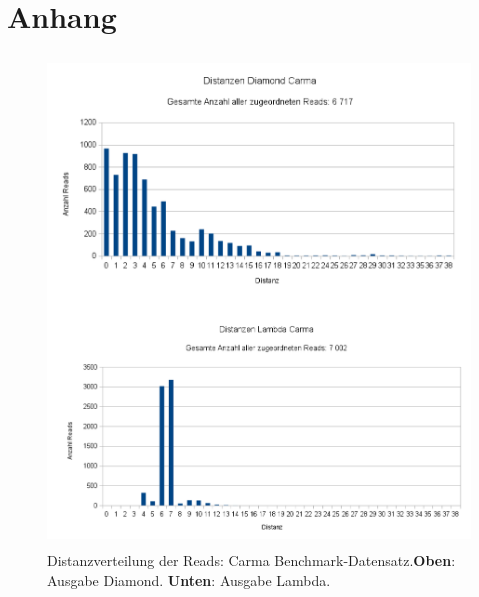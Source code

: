 \documentclass[10pt, a4paper]{report}[08.12.2015]
\begin{document}
\chapter{Anhang}
\begin{figure}[H]
      \centering
      \noindent\includegraphics[width=\linewidth,height=13cm,
      keepaspectratio]{Abbildungen/Carma_Distanzen_both.png}
      \caption[Distanzverteilung der Reads: Carma Benchmark-Datensatz.]{\small{Distanzverteilung der Reads: Carma Benchmark-Datensatz.\newline \textbf{Oben}: Ausgabe Diamond. \textbf{Unten}: Ausgabe Lambda.}}
      \label{fig:carma}
      \centering     
    \end{figure}
\end{document}
